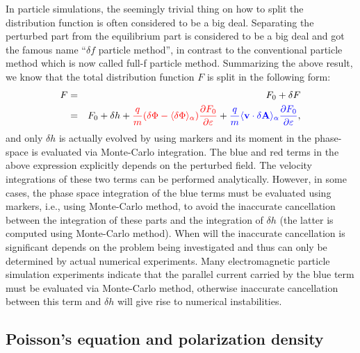 \documentclass{llncs}
\newcommand{\tmcolor}[2]{{\color{#1}{#2}}}
\begin{document}
In particle simulations, the seemingly trivial thing on how to split the
distribution function is often considered to be a big deal. Separating the
perturbed part from the equilibrium part is considered to be a big deal and
got the famous name ``$\delta f$ particle method'', in contrast to the
conventional particle method which is now called full-f particle method.
Summarizing the above result, we know that the total distribution function $F$
is split in the following form:
\begin{eqnarray}
  F & = & F_0 + \delta F \nonumber\\
  & = & F_0 + \delta h + \tmcolor{red}{\frac{q}{m} (\delta \Phi - \langle
  \delta \Phi \rangle_{\alpha}) \frac{\partial F_0}{\partial \varepsilon}} +
  \tmcolor{blue}{\frac{q}{m} \langle \mathbf{v} \cdot \delta \mathbf{A}
  \rangle_{\alpha} \frac{\partial F_0}{\partial \varepsilon}}, 
\end{eqnarray}
and only $\delta h$ is actually evolved by using markers and its moment in the
phase-space is evaluated via Monte-Carlo integration. The blue and red terms
in the above expression explicitly depends on the perturbed field. The
velocity integrations of these two terms can be performed analytically.
However, in some cases, the phase space integration of the blue terms must be
evaluated using markers, i.e., using Monte-Carlo method, to avoid the
inaccurate cancellation between the integration of these parts and the
integration of $\delta h$ (the latter is computed using Monte-Carlo method).
When will the inaccurate cancellation is significant depends on the problem
being investigated and thus can only be determined by actual numerical
experiments. Many electromagnetic particle simulation experiments indicate
that the parallel current carried by the blue term must be evaluated via
Monte-Carlo method, otherwise inaccurate cancellation between this term and
$\delta h$ will give rise to numerical instabilities.

\subsection{Poisson's equation and polarization density}\label{19-1-4-1}
\end{document}
